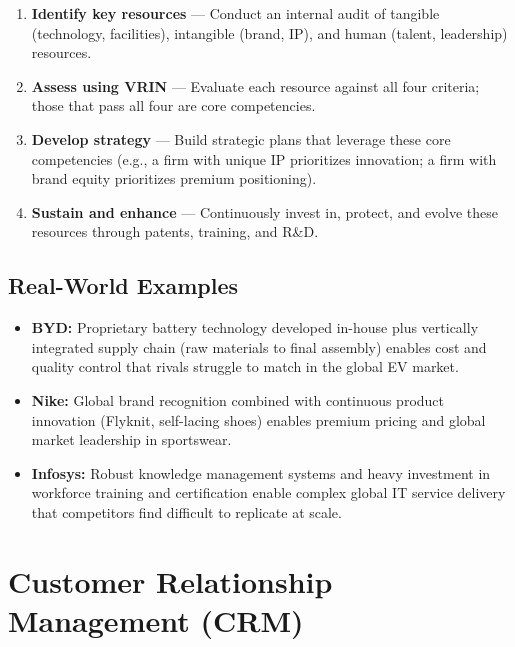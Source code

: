 \documentclass[11pt, letterpaper]{article}
\begin{document}
\begin{enumerate}[leftmargin=*, label=\textbf{\arabic*.}]
  \item \textbf{Identify key resources} --- Conduct an internal audit of tangible (technology, facilities), intangible (brand, IP), and human (talent, leadership) resources.
  \item \textbf{Assess using VRIN} --- Evaluate each resource against all four criteria; those that pass all four are core competencies.
  \item \textbf{Develop strategy} --- Build strategic plans that leverage these core competencies (e.g., a firm with unique IP prioritizes innovation; a firm with brand equity prioritizes premium positioning).
  \item \textbf{Sustain and enhance} --- Continuously invest in, protect, and evolve these resources through patents, training, and R\&D.
\end{enumerate}

\subsection{Real-World Examples}

\begin{itemize}[leftmargin=*]
  \item \textbf{BYD:} Proprietary battery technology developed in-house plus vertically integrated supply chain (raw materials to final assembly) enables cost and quality control that rivals struggle to match in the global EV market.
  \item \textbf{Nike:} Global brand recognition combined with continuous product innovation (Flyknit, self-lacing shoes) enables premium pricing and global market leadership in sportswear.
  \item \textbf{Infosys:} Robust knowledge management systems and heavy investment in workforce training and certification enable complex global IT service delivery that competitors find difficult to replicate at scale.
\end{itemize}

\newpage

\section{Customer Relationship Management (CRM)}
\end{document}
